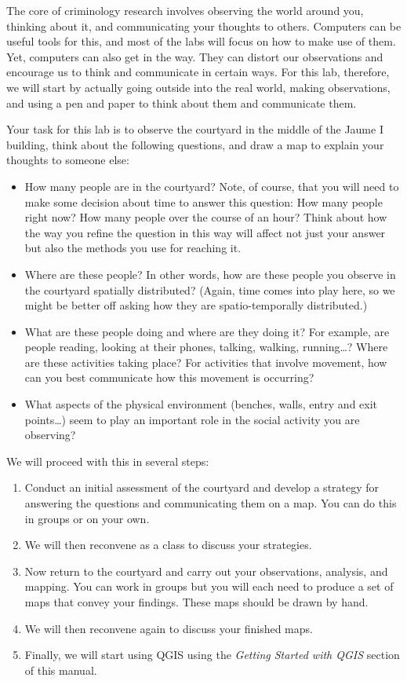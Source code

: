 \documentclass[]{book}
\providecommand{\tightlist}{%
  \setlength{\itemsep}{0pt}\setlength{\parskip}{0pt}}
\begin{document}
The core of criminology research involves observing the world around you, thinking about it, and communicating your thoughts to others. Computers can be useful tools for this, and most of the labs will focus on how to make use of them. Yet, computers can also get in the way. They can distort our observations and encourage us to think and communicate in certain ways. For this lab, therefore, we will start by actually going outside into the real world, making observations, and using a pen and paper to think about them and communicate them.

Your task for this lab is to observe the courtyard in the middle of the Jaume I building, think about the following questions, and draw a map to explain your thoughts to someone else:

\begin{itemize}
\tightlist
\item
  How many people are in the courtyard? Note, of course, that you will need to make some decision about time to answer this question: How many people right now? How many people over the course of an hour? Think about how the way you refine the question in this way will affect not just your answer but also the methods you use for reaching it.
\item
  Where are these people? In other words, how are these people you observe in the courtyard spatially distributed? (Again, time comes into play here, so we might be better off asking how they are spatio-temporally distributed.)
\item
  What are these people doing and where are they doing it? For example, are people reading, looking at their phones, talking, walking, running\ldots{}? Where are these activities taking place? For activities that involve movement, how can you best communicate how this movement is occurring?
\item
  What aspects of the physical environment (benches, walls, entry and exit points\ldots{}) seem to play an important role in the social activity you are observing?
\end{itemize}

We will proceed with this in several steps:

\begin{enumerate}
\def\labelenumi{\arabic{enumi}.}
\tightlist
\item
  Conduct an initial assessment of the courtyard and develop a strategy for answering the questions and communicating them on a map. You can do this in groups or on your own.
\item
  We will then reconvene as a class to discuss your strategies.
\item
  Now return to the courtyard and carry out your observations, analysis, and mapping. You can work in groups but you will each need to produce a set of maps that convey your findings. These maps should be drawn by hand.
\item
  We will then reconvene again to discuss your finished maps.
\item
  Finally, we will start using QGIS using the \emph{Getting Started with QGIS} section of this manual.
\end{enumerate}
\end{document}
